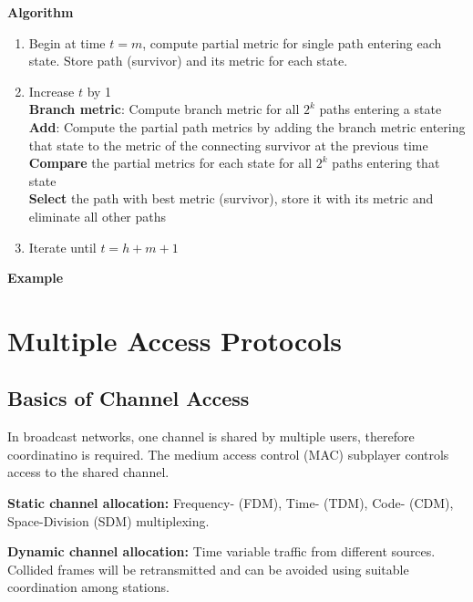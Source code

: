 \documentclass[a4paper, fontsize=8pt, landscape, DIV=1]{scrartcl}
\begin{document}
\begin{multicols*}{4}
  \textbf{Algorithm}
  \begin{enumerate}
    \item Begin at time $t=m$, compute partial metric for single path entering
    each state. Store path (survivor) and its metric for each state.
    \item Increase $t$ by 1\\
      \textbf{Branch metric}: Compute branch metric for all $2^k$ paths entering a state\\
      \textbf{Add}: Compute the partial path metrics by adding the branch metric entering
      that state to the metric of the connecting survivor at the previous time\\
      \textbf{Compare} the partial metrics for each state for all $2^k$ paths entering
      that state\\
      \textbf{Select} the path with best metric (survivor), store it with its metric and
      eliminate all other paths
    \item Iterate until $t=h+m+1$
  \end{enumerate}

  \textbf{Example}

  \section{Multiple Access Protocols}

  \subsection{Basics of Channel Access}
  In broadcast networks, one channel is shared by multiple users, therefore coordinatino is required.
  The medium access control (MAC) subplayer controls access to the shared channel.

  \textbf{Static channel allocation:} Frequency- (FDM), Time- (TDM), Code- (CDM),
   Space-Division (SDM) multiplexing.

  \textbf{Dynamic channel allocation:} Time variable traffic from different sources.
  Collided frames will be retransmitted and can be avoided using suitable coordination 
  among stations.


\end{multicols*}
\end{document}
